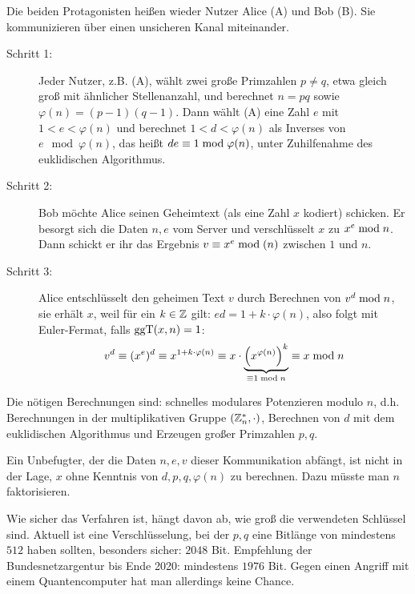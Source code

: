 \begin{anw}
	Die beiden Protagonisten heißen wieder Nutzer Alice (A) und Bob (B). 
	Sie kommunizieren über einen unsicheren Kanal miteinander.
	\begin{description}
		\item[Schritt 1:] Jeder Nutzer, z.B. (A), wählt zwei große Primzahlen $p \neq q$, etwa gleich groß mit ähnlicher Stellenanzahl, und berechnet $n = pq$ sowie $\varphi(n) = (p-1)(q-1)$. 
		Dann wählt (A) eine Zahl $e$ mit $1<e<\varphi(n)$ und berechnet $1 < d < \varphi(n)$ als Inverses von $e \mod \varphi(n)$, das heißt $de \equiv 1 \bmod \varphi(n)$, unter Zuhilfenahme des euklidischen Algorithmus.
		\item[Schritt 2:] Bob möchte Alice seinen Geheimtext (als eine Zahl $x$ kodiert) schicken. 
		Er besorgt sich die Daten $n,e$ vom Server und verschlüsselt $x$ zu $x^e \bmod n$. 
		Dann schickt er ihr das Ergebnis $v \equiv x^e \bmod (n)$ zwischen $1$ und $n$.
		\item[Schritt 3:] Alice entschlüsselt den geheimen Text $v$ durch Berechnen von $v^d \bmod n$, sie erhält $x$, weil für ein $k \in \mathbb{Z}$ gilt: $ed = 1 + k \cdot \varphi(n)$, also folgt mit Euler-Fermat, falls $\operatorname{ggT}(x,n) = 1$:
		\[ v^d \equiv (x^e)^d \equiv x^{1+k\cdot \varphi(n)} \equiv x \cdot \underbrace{\left(x^{\varphi(n)}\right)^k}_{\equiv 1 \bmod n} \equiv x \bmod n\]
	\end{description}
\end{anw}

\begin{bem}
	Die nötigen Berechnungen sind: schnelles modulares Potenzieren modulo $n$, d.h. Berechnungen in der multiplikativen Gruppe $(\mathbb{Z}_n^*,\cdot)$, Berechnen von $d$ mit dem euklidischen Algorithmus und Erzeugen großer Primzahlen $p,q$.
\end{bem}

\begin{bem}
	Ein Unbefugter, der die Daten $n,e,v$ dieser Kommunikation abfängt, ist nicht in der Lage, $x$ ohne Kenntnis von $d,p,q,\varphi(n)$ zu berechnen. 
	Dazu müsste man $n$ faktorisieren.
\end{bem}

\begin{bem}
	Wie sicher das Verfahren ist, hängt davon ab, wie groß die verwendeten Schlüssel sind. 
	Aktuell ist eine Verschlüsselung, bei der $p,q$ eine Bitlänge von mindestens $512$ haben sollten, besonders sicher: $2048$ Bit. 
	Empfehlung der Bundesnetzargentur bis Ende 2020: mindestens $1976$ Bit. 
	Gegen einen Angriff mit einem Quantencomputer hat man allerdings keine Chance.
\end{bem}

